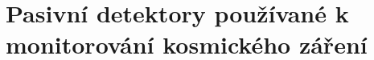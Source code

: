 \chapter{Pasivní detektory používané k monitorování kosmického záření}\label{sec:detektory_detektory}






